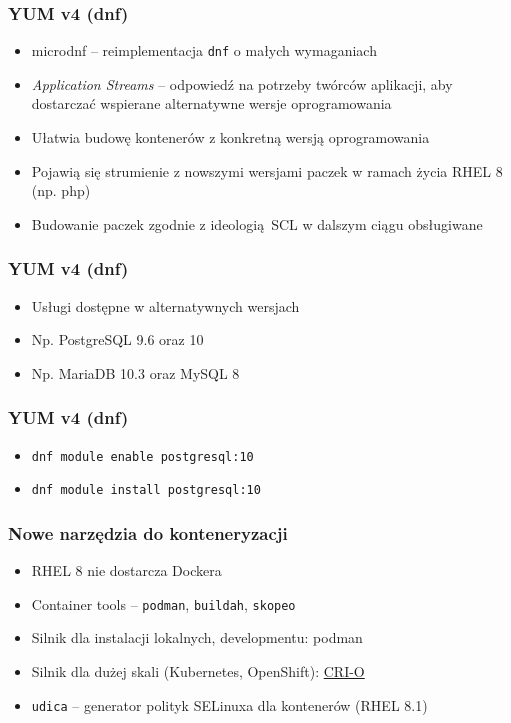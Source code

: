 \documentclass[dvipsnames,table]{beamer}
\begin{document}
\begin{frame}
\frametitle{YUM v4 (dnf)}
\begin{itemize}
	\item microdnf -- reimplementacja {\tt dnf} o małych wymaganiach
	\item {\em Application Streams} -- odpowiedź na potrzeby twórców aplikacji, aby dostarczać wspierane alternatywne wersje oprogramowania
	\item Ułatwia budowę kontenerów z konkretną wersją oprogramowania
	\item Pojawią się strumienie z nowszymi wersjami paczek w ramach życia RHEL 8 (np. php)
	\item Budowanie paczek zgodnie z ideologią SCL w dalszym ciągu obsługiwane
\end{itemize}
\begin{center}
\end{center}
\end{frame}

\begin{frame}
\frametitle{YUM v4 (dnf)}
\begin{itemize}
	\item Usługi dostępne w alternatywnych wersjach
	\item Np. PostgreSQL 9.6 oraz 10
	\item Np. MariaDB 10.3 oraz MySQL 8
\end{itemize}
\end{frame}

\begin{frame}
\frametitle{YUM v4 (dnf)}
\begin{itemize}
	\item {\tt dnf module enable postgresql:10}
	\item {\tt dnf module install postgresql:10}
\end{itemize}
%
\end{frame}

\begin{frame}
	\frametitle{Nowe narzędzia do konteneryzacji}
\begin{itemize}
	\item RHEL 8 nie dostarcza Dockera
	\item Container tools -- {\tt podman}, {\tt buildah}, {\tt skopeo}
	\item Silnik dla instalacji lokalnych, developmentu: podman
	\item Silnik dla dużej skali (Kubernetes, OpenShift): \href{https://cri-o.io/}{CRI-O}
	\item {\tt udica} -- generator polityk SELinuxa dla kontenerów (RHEL 8.1)
\end{itemize}
\end{frame}
\end{document}
